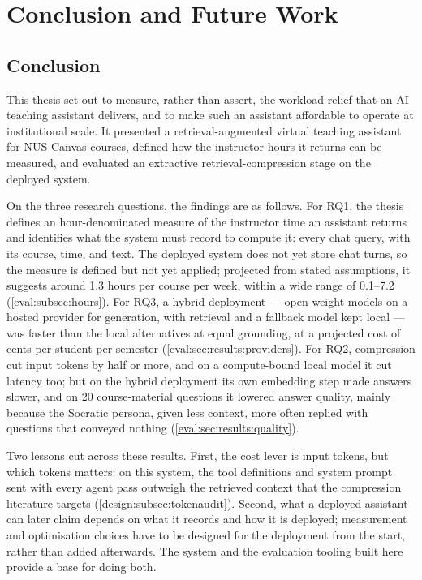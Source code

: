 \chapter{Conclusion and Future Work}
\label{ch:concl}

\section{Conclusion}

This thesis set out to measure, rather than assert, the workload relief that
an AI teaching assistant delivers, and to make such an assistant affordable
to operate at institutional scale. It presented a retrieval-augmented virtual
teaching assistant for NUS Canvas courses, defined how the
instructor-hours it returns can be measured, and evaluated an extractive
retrieval-compression stage on the deployed system.

On the three research questions, the findings are as follows. For RQ1, the
thesis defines an hour-denominated measure of the instructor time an
assistant returns and identifies what the system must record to compute it:
every chat query, with its course, time, and text. The deployed system does
not yet store chat turns, so the measure is defined but not yet applied;
projected from stated assumptions, it suggests around 1.3 hours per course
per week, within a wide range of 0.1--7.2 (\autoref{eval:subsec:hours}). For RQ3, a hybrid deployment --- open-weight
models on a hosted provider for generation, with retrieval and a fallback
model kept local --- was faster than the local alternatives at equal
grounding, at a projected cost of cents per student per semester
(\autoref{eval:sec:results:providers}). For RQ2, compression cut input tokens
by half or more, and on a compute-bound local model it cut latency too; but
on the hybrid deployment its own embedding step made answers slower, and on
20 course-material questions it lowered answer quality, mainly because the
Socratic persona, given less context, more often replied with questions that
conveyed nothing (\autoref{eval:sec:results:quality}).

Two lessons cut across these results. First, the cost lever is input tokens,
but which tokens matters: on this system, the tool definitions and system
prompt sent with every agent pass outweigh the retrieved context that the
compression literature targets (\autoref{design:subsec:tokenaudit}). Second,
what a deployed assistant can later claim depends on what it records and how
it is deployed; measurement and optimisation choices have to be designed for
the deployment from the start, rather than added afterwards. The system and
the evaluation tooling built here provide a base for doing both.

